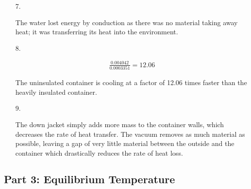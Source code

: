 ﻿\documentclass[12pt, letterpaper]{article}
\begin{document}
    \begin{enumerate}
        \item [7.]\mbox{}
        \begin{mdframed}
            The water lost energy by conduction as there was no material taking away heat; it was transferring its heat into the environment.
        \end{mdframed}

        \item [8.]\mbox{}
        \begin{mdframed}
            \begin{equation}
                \begin{gathered}
                \frac{0.004042}{0.0003351} = 12.06
                \end{gathered}
            \end{equation}

            The uninsulated container is cooling at a factor of 12.06 times faster than the heavily insulated container.
        \end{mdframed}

        \item [9.]\mbox{}
        \begin{mdframed}
            The down jacket simply adds more mass to the container walls, which decreases the rate of heat transfer. The vacuum removes as much material as possible, leaving a gap of very little material between the outside and the container which drastically reduces the rate of heat loss.
        \end{mdframed}        
    \end{enumerate}

    \pagebreak

    \subsection*{Part 3: Equilibrium Temperature}
\end{document}
